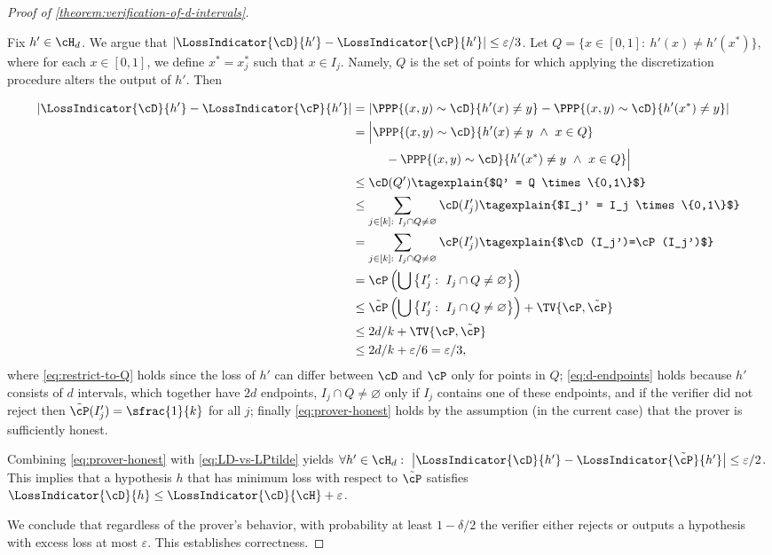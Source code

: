 \documentclass[11pt]{article}
\begin{document}
\begin{proof}[Proof of \cref{theorem:verification-of-d-intervals}]
\begin{itemize}
{			Fix $h' \in \cH_d$. We argue that $\left|\LossIndicator{\cD}{h'} - \LossIndicator{\cP}{h'}\right| \leq \varepsilon/3$. 
			Let $Q = \{x \in [0,1]: ~ h'(x) \neq h'(x^*) \}$, where for each $x \in [0,1]$, we define $x^* = x_j^*$ such that $x \in I_j$. Namely, $Q$ is the set of points for which applying the discretization procedure alters the output of $h'$. Then

			\begingroup
			\allowdisplaybreaks
			\begin{align}
				\left|\LossIndicator{\cD}{h'}-\LossIndicator{\cP}{h'}\right| &= \left|\PPP{(x,y) \sim \cD}{h'(x) \neq y}-\PPP{(x,y) \sim \cD}{h'(x^*) \neq y}\right| \nonumber\\
				&= \Big|\PPP{(x,y) \sim \cD}{h'(x) \neq y ~ \land ~ x \in Q} \nonumber\\
				& ~~~~~~~~ -\PPP{(x,y) \sim \cD}{h'(x^*) \neq y  ~ \land ~ x \in Q}\Big| \label{eq:restrict-to-Q}\\
				&\leq \cD(Q') \tagexplain{$Q' = Q \times \{0,1\}$}\nonumber\\
				&\leq \sum_{j \in [k]: ~ I_j \cap Q \neq \varnothing} \cD(I_j') \tagexplain{$I_j' = I_j \times \{0,1\}$} \nonumber\\
				&= \sum_{j \in [k]: ~ I_j \cap Q \neq \varnothing} \cP(I_j') \tagexplain{$\cD(I_j')=\cP(I_j')$}\nonumber\\
				&=\cP\left(\bigcup\left\{I_j': ~ I_j \cap Q \neq \varnothing\right\}\right) \nonumber\\
				&\leq \tilde{\cP}\left(\bigcup\left\{I_j': ~ I_j \cap Q \neq \varnothing\right\}\right) + \TV{\cP,\tilde{\cP}} \nonumber\\
				&\leq 2d/k + \TV{\cP,\tilde{\cP}} \label{eq:d-endpoints}\\
				&\leq 2d/k + \varepsilon/6 = \varepsilon/3, \label{eq:prover-honest}
			\end{align}%
			\endgroup
			where \cref{eq:restrict-to-Q} holds since the loss of $h'$ can differ between $\cD$ and $\cP$ only for points in $Q$; \cref{eq:d-endpoints} holds because $h'$ consists of $d$ intervals, which together have $2d$ endpoints, $I_j \cap Q \neq \varnothing$ only if $I_j$ contains one of these endpoints, and if the verifier did not reject then $\tilde{\cP}(I_j') = \sfrac{1}{k}$ for all $j$; finally \cref{eq:prover-honest} holds by the assumption (in the current case) that the prover is sufficiently honest.

			Combining \cref{eq:prover-honest} with \cref{eq:LD-vs-LPtilde} yields $\forall h' \in \cH_d: ~ \left|\LossIndicator{\cD}{h'} - \LossIndicator{\tilde{\cP}}{h'}\right| \leq \varepsilon/2$. This implies that a hypothesis $h$ that has minimum loss with respect to $\tilde{\cP}$ satisfies $\LossIndicator{\cD}{h} \leq \LossIndicator{\cD}{\cH} + \varepsilon$. 
		}
	\end{itemize}
	We conclude that regardless of the prover's behavior, with probability at least $1-\delta/2$ the verifier either rejects or outputs a hypothesis with excess loss at most $\varepsilon$. This establishes correctness.


\end{proof}
\end{document}
